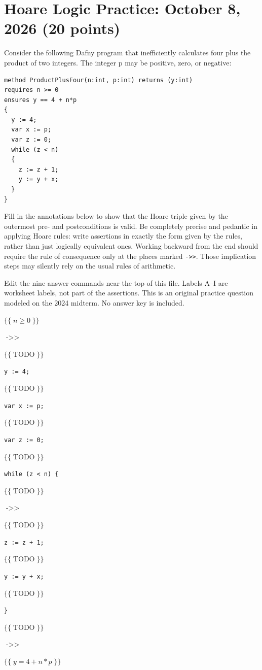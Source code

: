 \documentclass[11pt]{article}
\newcommand{\answerA}{\text{TODO}}
\newcommand{\answerB}{\text{TODO}}
\newcommand{\answerC}{\text{TODO}}
\newcommand{\answerD}{\text{TODO}}
\newcommand{\answerE}{\text{TODO}}
\newcommand{\answerF}{\text{TODO}}
\newcommand{\answerG}{\text{TODO}}
\newcommand{\answerH}{\text{TODO}}
\newcommand{\answerI}{\text{TODO}}
\newcommand{\assertion}[2]{%
  \noindent\makebox[1.8em][l]{\textsf{#1}}%
  $\{\!\{\;#2\;\}\!\}$\par\smallskip}
\newcommand{\code}[1]{\noindent\hspace*{1.8em}\texttt{#1}\par\smallskip}
\newcommand{\consequence}{\mathrel{\texttt{->>}}}
\begin{document}
\section*{Hoare Logic Practice: October 8, 2026 (20 points)}
Consider the following Dafny program that inefficiently calculates four
plus the product of two integers. The integer p may be positive, zero, or negative:
\begin{verbatim}
method ProductPlusFour(n:int, p:int) returns (y:int)
requires n >= 0
ensures y == 4 + n*p
{
  y := 4;
  var x := p;
  var z := 0;
  while (z < n)
  {
    z := z + 1;
    y := y + x;
  }
}
\end{verbatim}
Fill in the annotations below to show that the Hoare triple given by the
outermost pre- and postconditions is valid. Be completely precise and
pedantic in applying Hoare rules: write assertions in exactly the form
given by the rules, rather than just logically equivalent ones. Working
backward from the end should require the rule of consequence only at the
places marked \texttt{->>}. Those implication steps may silently rely on
the usual rules of arithmetic.

\medskip
\noindent Edit the nine answer commands near the top of this file.
Labels A--I are worksheet labels, not part of the assertions.
This is an original practice question modeled on the 2024 midterm.
No answer key is included.
\medskip

\assertion{}{n \ge 0}
\noindent\hspace*{1.8em}$\consequence$\par\smallskip
\assertion{A}{\answerA}
\code{y := 4;}
\assertion{B}{\answerB}
\code{var x := p;}
\assertion{C}{\answerC}
\code{var z := 0;}
\assertion{D}{\answerD}
\code{while (z < n) \{}
\assertion{E}{\answerE}
\noindent\hspace*{1.8em}$\consequence$\par\smallskip
\assertion{F}{\answerF}
\code{\quad z := z + 1;}
\assertion{G}{\answerG}
\code{\quad y := y + x;}
\assertion{H}{\answerH}
\code{\}}
\assertion{I}{\answerI}
\noindent\hspace*{1.8em}$\consequence$\par\smallskip
\assertion{}{y = 4 + n * p}
\end{document}
